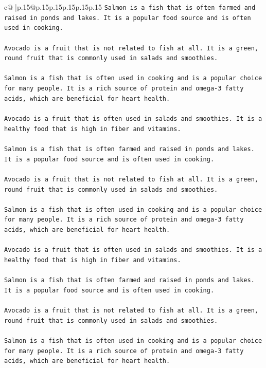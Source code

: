 \documentclass{article}
\begin{document}
{\begin{supertabular}{c@{$\;$}|p{.15\linewidth}@{}p{.15\linewidth}p{.15\linewidth}p{.15\linewidth}p{.15\linewidth}p{.15\linewidth}}
{{{\texttt{Salmon is a fish that is often farmed and raised in ponds and lakes. It is a popular food source and is often used in cooking.} \\
\\ 
\texttt{Avocado is a fruit that is not related to fish at all. It is a green, round fruit that is commonly used in salads and smoothies.} \\
\\ 
\texttt{Salmon is a fish that is often used in cooking and is a popular choice for many people. It is a rich source of protein and omega{-}3 fatty acids, which are beneficial for heart health.} \\
\\ 
\texttt{Avocado is a fruit that is often used in salads and smoothies. It is a healthy food that is high in fiber and vitamins.} \\
\\ 
\texttt{Salmon is a fish that is often farmed and raised in ponds and lakes. It is a popular food source and is often used in cooking.} \\
\\ 
\texttt{Avocado is a fruit that is not related to fish at all. It is a green, round fruit that is commonly used in salads and smoothies.} \\
\\ 
\texttt{Salmon is a fish that is often used in cooking and is a popular choice for many people. It is a rich source of protein and omega{-}3 fatty acids, which are beneficial for heart health.} \\
\\ 
\texttt{Avocado is a fruit that is often used in salads and smoothies. It is a healthy food that is high in fiber and vitamins.} \\
\\ 
\texttt{Salmon is a fish that is often farmed and raised in ponds and lakes. It is a popular food source and is often used in cooking.} \\
\\ 
\texttt{Avocado is a fruit that is not related to fish at all. It is a green, round fruit that is commonly used in salads and smoothies.} \\
\\ 
\texttt{Salmon is a fish that is often used in cooking and is a popular choice for many people. It is a rich source of protein and omega{-}3 fatty acids, which are beneficial for heart health.} \\
\\ 
}}}
\end{supertabular}}
\end{document}
